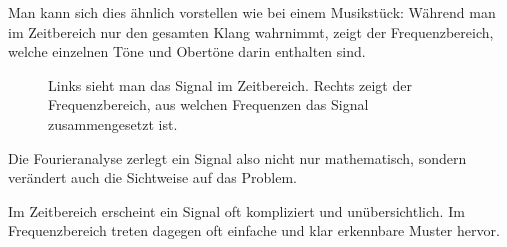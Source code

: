 Man kann sich dies ähnlich vorstellen
wie bei einem Musikstück:
Während man im Zeitbereich nur den gesamten Klang wahrnimmt,
zeigt der Frequenzbereich,
welche einzelnen Töne und Obertöne darin enthalten sind.
\newpage
\noindent
\FloatBarrier
\begin{figure}[H]
	\centering
	\caption{
		Links sieht man das Signal im Zeitbereich.
		Rechts zeigt der Frequenzbereich,
		aus welchen Frequenzen das Signal zusammengesetzt ist.
	}
	\label{fig:zeit-frequenzbereich}
\end{figure}

Die Fourieranalyse zerlegt ein Signal also nicht nur mathematisch,
sondern verändert auch die Sichtweise auf das Problem.

Im Zeitbereich erscheint ein Signal oft kompliziert und unübersichtlich.
Im Frequenzbereich treten dagegen oft einfache und klar erkennbare Muster hervor.

